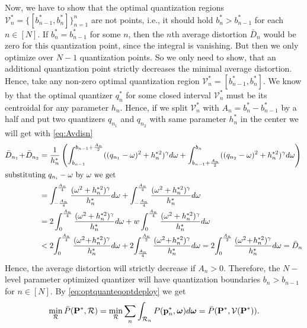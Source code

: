 \documentclass[smallabstract,smallcaptions]{dccpaper}
\renewcommand{\vq}{\mathbf p}
\renewcommand{\vQ}{\mathbf P}
\newcommand{\Pbar}{\ensuremath{\bar{P}}}         %
\newcommand{\Vor}{\ensuremath{\mathcal{V}}}         %
\newcommand{\Rset}{\ensuremath{\mathcal R}}
\newcommand{\Dis}{\ensuremath{D}}                    %
\newcommand{\AvDis}{\ensuremath{\bar{\Dis}}}         %
\begin{document}

  Now, we have to show that the optimal quantization regions $\Vor_n^*=\{[b^*_{n-1},b^*_n]\}_{n=1}^n$ are not points, i.e.,
  it should hold $b^*_n>b^*_{n-1}$ for each $n\in[N]$. If $b^*_n=b^*_{n-1}$ for some $n$, then the $n$th average distortion $\AvDis_n$
  would be zero for this quantization point, since the integral is vanishing. But then we only optimize over $N-1$
  quantization points. So we only need to show, that an additional quantization point strictly decreases the minimal
  average distortion.  Hence, take any non-zero optimal quantization region $\Vor_n^*=[b^*_{n-1},b^*_n]$. We know by
   that the optimal quantizer $q_n^*$ for some closed interval $\Vor_n^*$  must be its centroidal for
  any parameter $h_n$.  Hence, if we split  $\Vor_n^*$ with  $A_n=b^*_n-b^*_{n-1}$ by a half and put two quantizers
  $q_{n_1}$ and $q_{n_2}$ with same parameter $h_n^*$ in the center we will get with \eqref{eq:Avdisn}
  \begin{align}
      \AvDis_{n_1}\!+\!\AvDis_{n_2}&=\frac{1}{h_n^*} 
     \left( \int_{b_{n-1}}^{b_{n-1}+\frac{A_n}{2}} ( (q_{n_1}-\ome)^2 + h_n^{*2})^{\gam}d\ome
     +\int_{b_{n-1}+\frac{A_n}{2}}^{b_n}((q_{n_2}-\ome)^2+h_n^{*2})^{\gam}d\ome\right)\notag\\
   \intertext{substituting $q_{n_i}-\ome$ by $\ome$ we get} 
     & =  \int_{-\frac{A_n}{4}}^{\frac{A_n}{4}} \frac{(\ome^2+h_n^{*2})^{\gam}}{h_n^*}d\ome
     + \int_{-\frac{A_n}{4}}^{\frac{A_n}{4}} \frac{(\ome^2+h_n^{*2})^{\gam}}{h_n^*}d\ome\\
     & =  2\int_{0}^{\frac{A_n}{4}} \frac{(\ome^2+h_n^{*2})^{\gam}}{h_n^*}d\ome 
     + w\int_{0}^{\frac{A_n}{4}}    \frac{ (\ome^2+h_n^{*2})^{\gam}}{h_n^*}d\ome\\
     & <  2\!\int_{0}^{\frac{A_n}{4}} \frac{(\ome^2\!+\!h_n^{*2})^{\gam}}{h_n^*}d\ome
     + 2\!\int_{\frac{A_n}{4}}^{\frac{A_n}{2}} \frac{(\ome^2\!+\!h_n^{*2})^{\gam}}{h_n^*}d\ome
     = 2\!\int_0^{\frac{A_n}{2}} \frac{(\ome^2\!+\!h_n^{*2})^\gam}{h_n^*} d\ome=\AvDis_n\notag
  \end{align}
  Hence, the average distortion will strictly decrease if $A_n>0$. Therefore, the $N-$level parameter optimized
  quantizer will have
  quantization boundaries $b_n\!>\!b_{n\!-\!1}$ for $n\in[N]$.
  By \eqref{eq:optquanteqoptdeploy} we get 
  \begin{align}
    \min_{\Rset} \Pbar(\vQ^*,\Rset)= \min_{\Rset}\sum_n \int_{\Rset_n} P(\vq^*_n,\vome)d\vome=\Pbar(\vQ^*,\Vor(\vQ^*)).
  \end{align}
\end{document}
